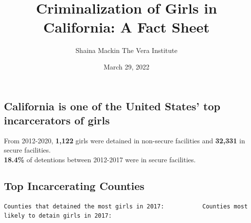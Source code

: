 \documentclass[
]{article}
\title{Criminalization of Girls in California: A Fact Sheet}
\author{Shaina Mackin \textbar{} The Vera Institute}
\date{March 29, 2022}
\begin{document}
\maketitle

\hypertarget{california-is-one-of-the-united-states-top-incarcerators-of-girls}{%
\subsection{California is one of the United States' top incarcerators of
girls}\label{california-is-one-of-the-united-states-top-incarcerators-of-girls}}

From 2012-2020, \textbf{1,122} girls were detained in non-secure
facilities and \textbf{32,331} in secure facilities.\\
\textbf{18.4\%} of detentions between 2012-2017 were in secure
facilities.

\hypertarget{top-incarcerating-counties}{%
\subsection{Top Incarcerating
Counties}\label{top-incarcerating-counties}}

\begin{verbatim}
Counties that detained the most girls in 2017:           Counties most likely to detain girls in 2017:
\end{verbatim}
\end{document}
